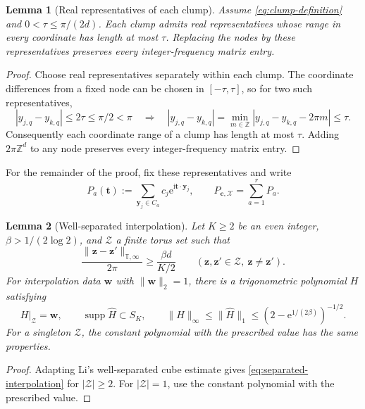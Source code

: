 \documentclass[11pt]{article}
\newtheorem{lemma}{Lemma}
\newcommand{\X}{\mathcal X}
\newcommand{\T}{\mathbb T}
\newcommand{\Z}{\mathbb Z}
\newcommand{\ii}{\mathrm i}
\begin{document}
\begin{lemma}[Real representatives of each clump]\label{lem:clump-lifts}
Assume \eqref{eq:clump-definition} and $0<\tau\le\pi/(2d)$. Each clump admits real representatives whose range in every coordinate has length at most $\tau$. Replacing the nodes by these representatives preserves every integer-frequency matrix entry.
\end{lemma}
\begin{proof}
Choose real representatives separately within each clump. The coordinate differences from a fixed node can be chosen in $[-\tau,\tau]$, so for two such representatives,
\[
|y_{j,q}-y_{k,q}|\le2\tau\le\pi/2<\pi\quad\Longrightarrow\quad |y_{j,q}-y_{k,q}|=\min_{m\in\Z}|y_{j,q}-y_{k,q}-2\pi m|\le\tau.
\]
Consequently each coordinate range of a clump has length at most $\tau$. Adding $2\pi\Z^d$ to any node preserves every integer-frequency matrix entry.
\end{proof}
For the remainder of the proof, fix these representatives and write
\[
P_a(\bm t):=\sum_{\bm y_j\in C_a}c_j\mathrm e^{\ii\bm t\cdot\bm y_j},\qquad P_{\bm c,\X}=\sum_{a=1}^rP_a.
\]

\begin{lemma}[Well-separated interpolation]\label{lem:separated-interpolation}
Let $K\ge2$ be an even integer, $\beta>1/(2\log2)$, and $\mathcal Z$ a finite torus set such that
\[
\frac{\|\bm z-\bm z'\|_{\T,\infty}}{2\pi}\ge\frac{\beta d}{K/2}\qquad(\bm z,\bm z'\in\mathcal Z,\ \bm z\ne\bm z').
\]
For interpolation data $\bm w$ with $\|\bm w\|_2=1$, there is a trigonometric polynomial $H$ satisfying
\begin{equation}\label{eq:separated-interpolation}
H|_{\mathcal Z}=\bm w,\qquad \operatorname{supp}\widehat H\subset S_K,\qquad \|H\|_\infty\le\|\widehat H\|_1\le\left(2-\mathrm e^{1/(2\beta)}\right)^{-1/2}.
\end{equation}
For a singleton $\mathcal Z$, the constant polynomial with the prescribed value has the same properties.
\end{lemma}
\begin{proof}
Adapting Li's well-separated cube estimate \cite[Theorem~2.3]{Li} gives \eqref{eq:separated-interpolation} for $|\mathcal Z|\ge2$. For $|\mathcal Z|=1$, use the constant polynomial with the prescribed value.
\end{proof}
\end{document}
